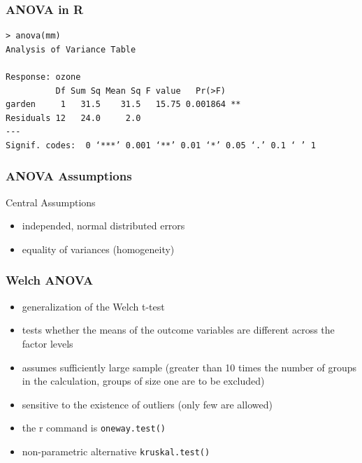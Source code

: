 \begin{frame}[fragile]\frametitle{ANOVA in R}
\footnotesize
\begin{verbatim}
> anova(mm)
Analysis of Variance Table

Response: ozone
          Df Sum Sq Mean Sq F value   Pr(>F)   
garden     1   31.5    31.5   15.75 0.001864 **
Residuals 12   24.0     2.0                    
---
Signif. codes:  0 ‘***’ 0.001 ‘**’ 0.01 ‘*’ 0.05 ‘.’ 0.1 ‘ ’ 1
\end{verbatim}
\end{frame}


\begin{frame}\frametitle{ANOVA Assumptions}
  \begin{alertblock}{Central Assumptions}
  \begin{itemize}
  \item independed, normal distributed errors
  \item equality of variances (homogeneity)
  \end{itemize}
  \end{alertblock}
\end{frame}


\begin{frame}[allowframebreaks]\frametitle{Welch ANOVA}
\begin{itemize}
\item generalization of the Welch t-test
\item tests whether the means of the outcome variables are different across the factor levels
\item assumes sufficiently large sample (greater than 10 times the number of groups in the calculation, groups of size one are to be excluded)
\item sensitive to the existence of outliers (only few are allowed)
\item the r command is \texttt{oneway.test()}
\item non-parametric alternative \texttt{kruskal.test()}
\end{itemize}
\end{frame}

